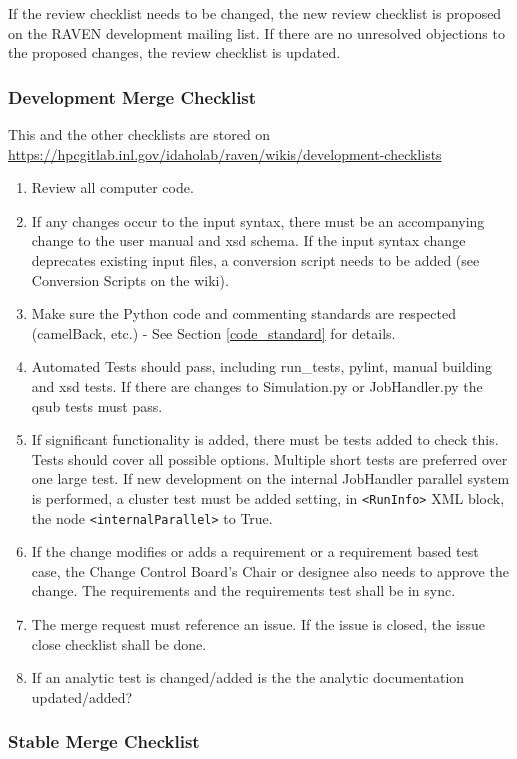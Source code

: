 \documentclass{article}
\begin{document}
If the review checklist needs to be changed, the new review checklist
is proposed on the RAVEN development mailing list.  If there are no
unresolved objections to the proposed changes, the review checklist is
updated.

\subsubsection{Development Merge Checklist}

This and the other checklists are stored on \url{https://hpcgitlab.inl.gov/idaholab/raven/wikis/development-checklists}


\begin{enumerate}
\item Review all computer code.
\item If any changes occur to the input syntax, there must be an accompanying change to the user manual and xsd schema. If the input syntax change deprecates existing input files, a conversion script needs to be added (see Conversion Scripts on the wiki).
\item Make sure the Python code and commenting standards are respected (camelBack, etc.) - See Section \ref{code_standard} for details.
\item Automated Tests should pass, including run\_tests, pylint, manual building and xsd tests. If there are changes to Simulation.py or JobHandler.py the qsub tests must pass.
\item If significant functionality is added, there must  be tests added to check this. Tests should cover all possible options.  Multiple short tests are preferred over one large test. If new development on the internal JobHandler parallel system is performed, a cluster test must be added setting, in \verb'<RunInfo>' XML block, the node \verb'<internalParallel>' to True.
\item If the change modifies or adds a requirement or a requirement based test case, the Change Control Board's Chair or designee also needs to approve the change.  The requirements and the requirements test shall be in sync.
\item The merge request must reference an issue.  If the issue is closed, the issue close checklist shall be done.
\item If an analytic test is changed/added is the the analytic documentation updated/added?
\end{enumerate}

\subsubsection{Stable Merge Checklist}
\end{document}
